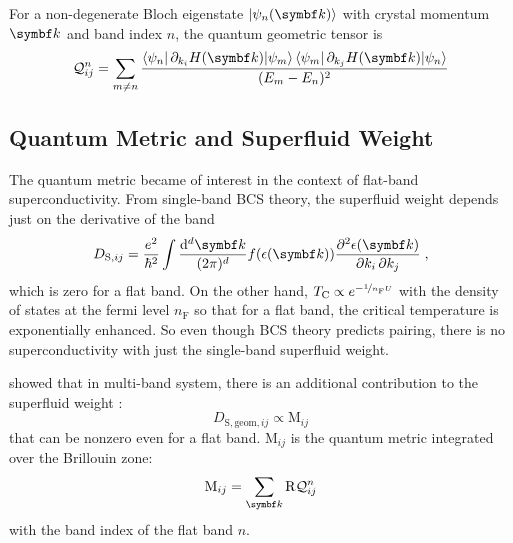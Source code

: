 \documentclass[../main.tex]{subfiles}
\begin{document}
For a non-degenerate Bloch eigenstate \(\ket{\psi_n (\vb{k})}\) with crystal momentum \(\vb{k}\) and band index \(n\), the quantum geometric tensor is
\begin{equation}
	\mathcal{Q}_{ij}^n = \sum_{m \neq n} \frac{\braket{\psi_n | \pdif{k_i} H (\vb{k}) | \psi_m} \braket{\psi_m | \pdif{k_j} H (\vb{k}) | \psi_n}}{(E_m - E_n)^2}
\end{equation}

\subsection*{Quantum Metric and Superfluid Weight}

The quantum metric became of interest in the context of flat-band superconductivity.
From single-band BCS theory, the superfluid weight depends just on the derivative of the band
\begin{equation}
	D_{\mathrm{S}, ij} = \frac{e^2}{\hbar^2} \int \frac{\odif[order={d}]{\vb{k}}}{(2\pi)^d} f(\epsilon (\vb{k})) \pdv{\epsilon (\vb{k})}{k_i, k_j}\;,
\end{equation}
which is zero for a flat band.
On the other hand, \(T_{\mathrm{C}} \propto e^{-\nicefrac{1}{n_{\mathrm{F}} U}}\) with the density of states at the fermi level \(n_{\mathrm{F}}\) so that for a flat band, the critical temperature is exponentially enhanced.
So even though BCS theory predicts pairing, there is no superconductivity with just the single-band superfluid weight.

\citeauthor{peottaSuperfluidityTopologicallyNontrivial2015} showed that in multi-band system, there is an additional contribution to the superfluid weight \cite{peottaSuperfluidityTopologicallyNontrivial2015}:
\begin{equation}\label{eq:geometric SF weight}
	D_{\mathrm{S}, \mathrm{geom}, ij} \propto \mathrm{M}_{ij}
\end{equation}
that can be nonzero even for a flat band.
\(\mathrm{M}_{ij}\) is the quantum metric integrated over the Brillouin zone:
\begin{equation}
	\mathrm{M}_{ij} = \sum_{\vb{k}} \Re \mathcal{Q}_{ij}^n
\end{equation}
with the band index of the flat band \(n\).
\end{document}
